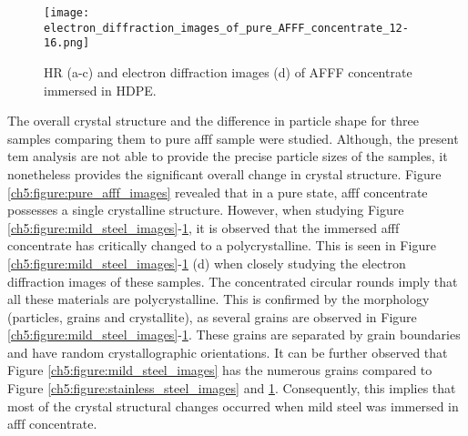 \begin{figure}[H]
\centering

\texttt{[image: electron\_diffraction\_images\_of\_pure\_AFFF\_concentrate\_12-16.png]}

\caption{HR (a-c) and electron diffraction images (d) of AFFF concentrate immersed in HDPE.}
\label{ch5:figure:hdpe_images}
\end{figure}

The overall crystal structure and the difference in particle shape for three samples comparing them to pure \acrshort{afff} sample were studied. Although, the present \acrshort{tem} analysis are not able to provide the precise particle sizes of the samples, it nonetheless provides the significant overall change in crystal structure. Figure \ref{ch5:figure:pure_afff_images} revealed that in a pure state, \acrshort{afff} concentrate possesses a single crystalline structure. However, when studying Figure \ref{ch5:figure:mild_steel_images}-\ref{ch5:figure:hdpe_images}, it is observed that the immersed \acrshort{afff} concentrate has critically changed to a polycrystalline. This is seen in Figure \ref{ch5:figure:mild_steel_images}-\ref{ch5:figure:hdpe_images} (d) when closely studying the electron diffraction images of these samples. The concentrated circular rounds imply that all these materials are polycrystalline. This is confirmed by the morphology (particles, grains and crystallite), as several grains are observed in Figure \ref{ch5:figure:mild_steel_images}-\ref{ch5:figure:hdpe_images}. These grains are separated by grain boundaries and have random crystallographic orientations. It can be further observed that Figure \ref{ch5:figure:mild_steel_images} has the numerous grains compared to Figure \ref{ch5:figure:stainless_steel_images} and \ref{ch5:figure:hdpe_images}.  Consequently, this implies that most of the crystal structural changes occurred when mild steel was immersed in \acrshort{afff} concentrate. 

